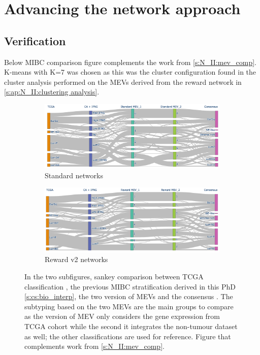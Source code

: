 \chapter{Advancing the network approach}

\newpage
\section{Verification} \label{ap:N_II:val_mibc_comp}

Below MIBC comparison figure complements the work from \cref{s:N_II:mev_comp}. K-means with K=7 was chosen as this was the cluster configuration found in the cluster analysis performed on the MEVs derived from the reward network in \cref{s:ap:N_II:clustering analysis}.

\begin{figure}[!htb]
    \centering
    \begin{subfigure}{0.9\linewidth}
        \includegraphics[width=1.0\textwidth,keepaspectratio]{Sections/Network_II/validation/mevs_comp_std_K_7.png}
        \caption{Standard networks}
    \end{subfigure} %
    \centering
    \begin{subfigure}{0.9\linewidth}
        \includegraphics[width=1.0\textwidth,keepaspectratio]{Sections/Network_II/validation/mevs_comp_rwd_K_7.png}
        \caption{Reward v2 networks}
    \end{subfigure}
    \centering
    \caption[MEV vs iMEV with K-means K=5]{In the two subfigures, sankey comparison between TCGA classification \citep{Robertson2017-mg}, the previous MIBC stratification derived in this PhD \cref{s:cs:bio_interp}, the two version of MEVs and the consensus \citep{Kamoun2020-tj}. The subtyping based on the two MEVs are the main groups to compare as the version of MEV only considers the gene expression from TCGA cohort while the second it integrates the non-tumour dataset as well; the other classifications are used for reference. Figure that complements work from \cref{s:N_II:mev_comp}. }
    \label{fig:ap:mevs_comp}
\end{figure}


